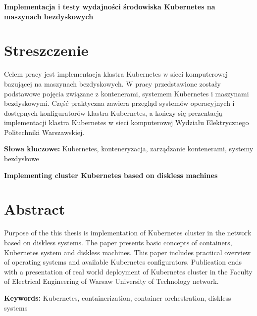 \newpage
\begin{center}
  \large \bf
  Implementacja i testy wydajności środowiska Kubernetes na maszynach bezdyskowych
\end{center}

\section*{Streszczenie}

Celem pracy jest implementacja klastra Kubernetes w sieci komputerowej bazującej
na maszynach bezdyskowych.
W pracy przedstawione zostały podstawowe pojęcia związane z kontenerami,
systemem Kubernetes i maszynami bezdyskowymi.
Część praktyczna zawiera przegląd systemów operacyjnych i dostępnych
konfiguratorów klastra Kubernetes, a kończy się prezentacją implementacji
klastra Kubernetes w sieci komputerowej
Wydziału Elektrycznego Politechniki Warszawskiej.

\bigskip
{\noindent\bf Słowa kluczowe:} Kubernetes, konteneryzacja, zarządzanie kontenerami, systemy bezdyskowe

\vskip 2cm


\begin{center}
  \large \bf
  Implementing cluster Kubernetes based on diskless machines
\end{center}

\section*{Abstract}

Purpose of the this thesis is implementation of Kubernetes cluster in
the network based on diskless systems.
The paper presents basic concepts of containers, Kubernetes system and
diskless machines.
This paper includes practical overview of operating systems and available
Kubernetes configurators. Publication ends with a presentation of
real world deployment of Kubernetes cluster in the
Faculty of Electrical Engineering of Warsaw University of Technology
network.

\bigskip
{\noindent\bf Keywords:} Kubernetes, containerization, container orchestration, diskless systems

\vfill
